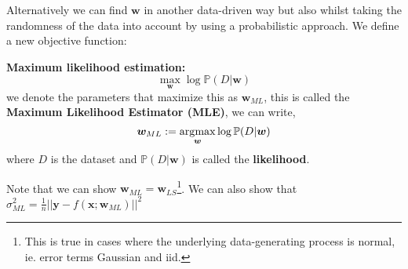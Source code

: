 Alternatively we can find $\bm{w}$ in another data-driven way but also whilst taking the randomness of the data into account by using a probabilistic approach. We define a new objective function:
\begin{definition}
    \textbf{Maximum likelihood estimation:} \\
    \begin{equation}
        \max_{\bm{w}} \log \mathbb{P}(D| \bm{w})
    \end{equation}
    we denote the parameters that maximize this as $\bm{w}_{ML}$, this is called the \textbf{Maximum Likelihood Estimator (MLE)}, we can write,
    \begin{equation}
        \bm{w}_{ML} := \operatorname*{arg\!\max}_{\bm{w}} \log \mathbb{P}(D|\bm{w}) 
    \end{equation}
    where $D$ is the dataset and $\mathbb{P}(D|\bm{w})$ is called the \textbf{likelihood}. 
\end{definition}

Note that we can show $\bm{w}_{ML}=\bm{w}_{LS}$\footnote{This is true in cases where the underlying data-generating process is normal, ie. error terms Gaussian and iid.}. We can also show that $\sigma_{ML}^{2} = \frac{1}{n} || \bm{y}-f(\bm{x};\bm{w}_{ML})||^{2}$
